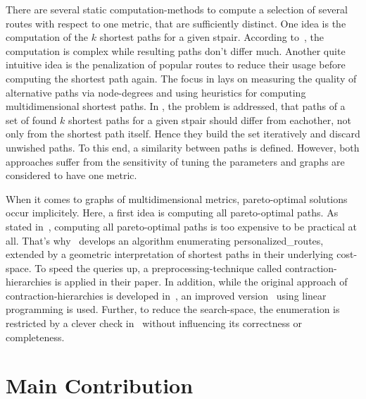         There are several static computation-methods to compute a selection of several routes with respect to one metric, that are sufficiently distinct.
        One idea is the computation of the $k$ shortest paths for a given \gls{stpair}.
        According to~\cite{eppstein:finding_k_shortest_paths}, the computation is complex while resulting paths don't differ much.
        Another quite intuitive idea is the penalization of popular routes to reduce their usage before computing the shortest path again.
        The focus in \cite{bader:alternative-route-graphs} lays on measuring the quality of alternative paths via node-degrees and using heuristics for computing multidimensional shortest paths.
        In \cite{chondrogiannis:k_shortest_paths}, the problem is addressed, that paths of a set of found $k$ shortest paths for a given \gls{stpair} should differ from eachother, not only from the shortest path itself.
        Hence they build the set iteratively and discard unwished paths.
        To this end, a similarity between paths is defined.
        However, both approaches suffer from the sensitivity of tuning the parameters and graphs are considered to have one metric.

        When it comes to graphs of multidimensional metrics, pareto-optimal solutions occur implicitely.
        Here, a first idea is computing all pareto-optimal paths.
        As stated in~\cite{delling:pareto-paths}, computing all pareto-optimal paths is too expensive to be practical at all.
        That's why~\cite{barth:alternative_multicriteria_routes} develops an algorithm enumerating \glspl{personalized_route}, extended by a geometric interpretation of shortest paths in their underlying cost-space.
        To speed the queries up, a preprocessing-technique called \gls{contraction-hierarchies} is applied in their paper.
        In addition, while the original approach of contraction-hierarchies is developed in~\cite{geisberger:contraction_hierarchies}, an improved version~\cite{funke:personal-routes} using linear programming is used.
        Further, to reduce the search-space, the enumeration is restricted by a clever check in~\cite{barth:alternative_routes} without influencing its correctness or completeness.

\section{Main Contribution}


